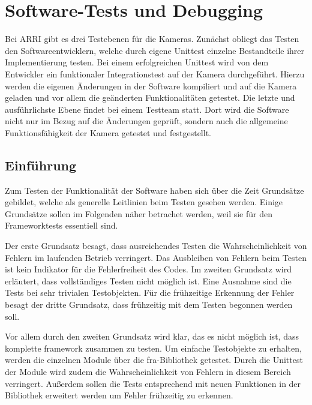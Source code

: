 
\chapter{Software-Tests und Debugging} \label{sec:test}
Bei \ac{ARRI} gibt es drei Testebenen für die Kameras. Zunächst obliegt das Testen den Softwareentwicklern, welche durch eigene Unittest einzelne Bestandteile ihrer Implementierung testen. Bei einem erfolgreichen Unittest wird von dem Entwickler ein funktionaler Integrationstest auf der Kamera durchgeführt. Hierzu werden die eigenen Änderungen in der Software kompiliert und auf die Kamera geladen und vor allem die geänderten Funktionalitäten getestet. Die letzte und ausführlichste Ebene findet bei einem Testteam statt. Dort wird die Software nicht nur im Bezug auf die Änderungen geprüft, sondern auch die allgemeine Funktionsfähigkeit der Kamera getestet und festgestellt.


\section{Einführung}
Zum Testen der Funktionalität der Software haben sich über die Zeit Grundsätze gebildet, welche als generelle Leitlinien beim Testen gesehen werden. \citep[S. 53]{spillner2005basiswissen}
Einige Grundsätze sollen im Folgenden näher betrachet werden, weil sie für den Frameworktests essentiell sind. 

Der erste Grundsatz besagt, dass ausreichendes Testen die Wahrscheinlichkeit von Fehlern im laufenden Betrieb verringert. Das Ausbleiben von Fehlern beim Testen ist kein Indikator für die Fehlerfreiheit des Codes.
Im zweiten Grundsatz wird erläutert, dass vollständiges Testen nicht möglich ist. Eine Ausnahme sind die Tests bei sehr trivialen Testobjekten. 
Für die frühzeitige Erkennung der Fehler besagt der dritte Grundsatz, dass frühzeitig mit dem Testen begonnen werden soll. \citep[S. 53]{spillner2005basiswissen}


Vor allem durch den zweiten Grundsatz wird klar, das es nicht möglich ist, dass komplette \gls{framework} zusammen zu testen. Um einfache Testobjekte zu erhalten, werden die einzelnen Module über die \ac{fra}-Bibliothek getestet. Durch die Unittest der Module wird zudem die Wahrscheinlichkeit von Fehlern in diesem Bereich verringert. Außerdem sollen die Tests entsprechend mit neuen Funktionen in der Bibliothek erweitert werden um Fehler frühzeitig zu erkennen.



